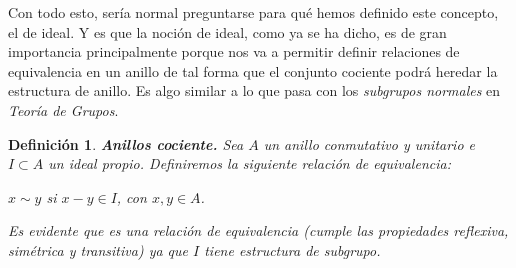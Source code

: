 \documentclass[12pt]{article}
\newtheorem{definition}[theorem]{Definición}
\begin{document}
Con todo esto, sería normal preguntarse para qué hemos definido este concepto, el de ideal. Y es que la noción de ideal, como ya se ha dicho, es de gran importancia principalmente porque nos va a permitir definir relaciones de equivalencia en un anillo de tal forma que el conjunto cociente podrá heredar la estructura de anillo. Es algo similar a lo que pasa con los \textit{subgrupos normales} en \textit{Teoría de Grupos}.
 
\begin{definition}\label{eq:ancoci} \textbf{\textit{Anillos cociente.}} Sea $A$ un anillo conmutativo y unitario e $I \subset A$ un ideal propio. Definiremos la siguiente relación de equivalencia: \begin{center}
$x \sim y$ si $x-y \in I$, con $x,y \in A$.
\end{center}
Es evidente que es una relación de equivalencia (cumple las propiedades reflexiva, simétrica y transitiva) ya que $I$ tiene estructura de subgrupo.


\end{definition}
\end{document}
